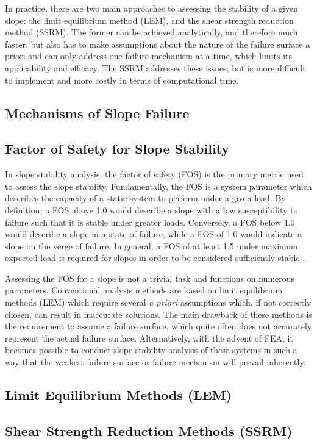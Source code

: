In practice, there are two main approaches to assessing the stability of a given slope: the limit equilibrium method (LEM), and the shear strength reduction method (SSRM). The former can be achieved analytically, and therefore much faster, but also has to make assumptions about the nature of the failure surface a priori and can only address one failure mechanism at a time, which limits its applicability and efficacy. The SSRM addresses these issues, but is more difficult to implement and more costly in terms of computational time. 


\subsection{Mechanisms of Slope Failure}

\subsection{Factor of Safety for Slope Stability}

In slope stability analysis, the factor of safety (FOS) is the primary metric used to assess the slope stability. Fundamentally, the FOS is a system parameter which describes the capacity of a static system to perform under a given load. By definition, a FOS above 1.0 would describe a slope with a low susceptibility to failure such that it is stable under greater loads. Conversely, a FOS below 1.0 would describe a slope in a state of failure, while a FOS of 1.0 would indicate a slope on the verge of failure. In general, a FOS of at least 1.5 under maximum expected load is required for slopes in order to be considered sufficiently stable \citep{das_principles_2009}.

Assessing the FOS for a slope is not a trivial task and functions on numerous parameters. Conventional analysis methods are based on limit equilibrium methods (LEM) which require several \textit{a priori} assumptions which, if not correctly chosen, can result in inaccurate solutions. The main drawback of these methods is the requirement to assume a failure surface, which quite often does not accurately represent the actual failure surface. Alternatively, with the advent of FEA, it becomes possible to conduct slope stability analysis of these systems in such a way that the weakest failure surface or failure mechanism will prevail inherently.


\subsection{Limit Equilibrium Methods (LEM)}

\subsection{Shear Strength Reduction Methods (SSRM)}